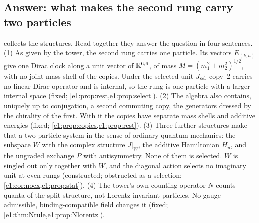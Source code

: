 \subsection{Answer: what makes the second rung carry two particles}
\label{e1:sec:answer}

 collects the structures. Read together they answer the question in four sentences. (1) As given by the tower, the second
rung carries one particle. Its vectors $E_{(k,a)}$ give one Dirac clock along a unit vector of $\mathbb{R}^{6,6}$, of mass $M=(m_1^2+m_2^2)^{1/2}$, with
no joint mass shell of the copies. Under the selected unit $J_{\rm sel}$ copy~2 carries no linear Dirac operator and is internal, so the rung
is one particle with a larger internal space (fixed; \cref{e1:prop:rest,e1:prop:select}). (2) The algebra also contains, uniquely up to
conjugation, a second commuting copy, the generators dressed by the chirality of the first. With it the copies have separate mass shells and
additive energies (fixed; \cref{e1:prop:copies,e1:prop:rest}). (3) Three further structures make that a two-particle system in the sense of
ordinary quantum mechanics: the subspace $W$ with the complex structure $J|_W$, the additive Hamiltonian $H_u$, and the ungraded exchange $P$
with antisymmetry. None of them is selected. $W$ is singled out only together with $\overline W$, and the diagonal action selects no imaginary unit at
even rungs (constructed; obstructed as a selection; \cref{e1:cor:nocx,e1:prop:stat}). (4) The tower's own counting operator $N$ counts quanta
of the split structure, not Lorentz-invariant particles. No gauge-admissible, binding-compatible field changes it (fixed;
\cref{e1:thm:Nrule,e1:prop:Nlorentz}).

